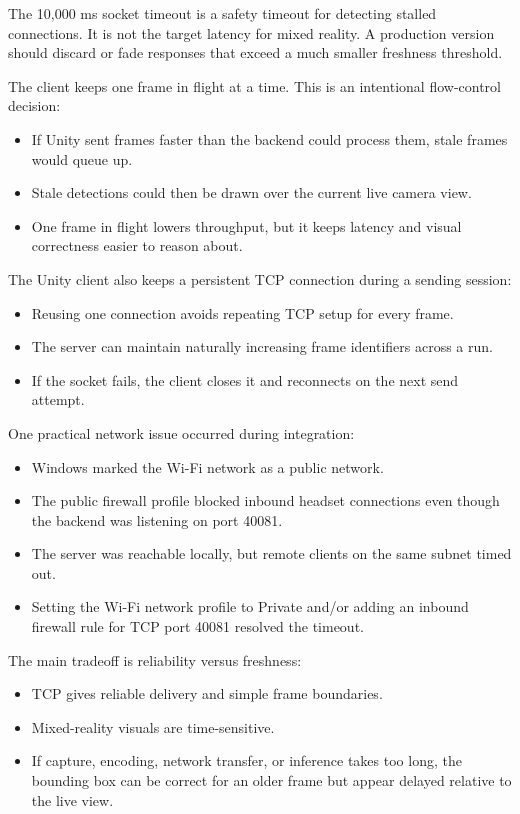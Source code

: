 \documentclass[11pt]{article}
\begin{document}
The 10,000 ms socket timeout is a safety timeout for detecting stalled connections. It is not the target latency for mixed reality. A production version should discard or fade responses that exceed a much smaller freshness threshold.

The client keeps one frame in flight at a time. This is an intentional flow-control decision:

\begin{itemize}
    \item If Unity sent frames faster than the backend could process them, stale frames would queue up.
    \item Stale detections could then be drawn over the current live camera view.
    \item One frame in flight lowers throughput, but it keeps latency and visual correctness easier to reason about.
\end{itemize}

The Unity client also keeps a persistent TCP connection during a sending session:

\begin{itemize}
    \item Reusing one connection avoids repeating TCP setup for every frame.
    \item The server can maintain naturally increasing frame identifiers across a run.
    \item If the socket fails, the client closes it and reconnects on the next send attempt.
\end{itemize}

One practical network issue occurred during integration:

\begin{itemize}
    \item Windows marked the Wi-Fi network as a public network.
    \item The public firewall profile blocked inbound headset connections even though the backend was listening on port 40081.
    \item The server was reachable locally, but remote clients on the same subnet timed out.
    \item Setting the Wi-Fi network profile to Private and/or adding an inbound firewall rule for TCP port 40081 resolved the timeout.
\end{itemize}

The main tradeoff is reliability versus freshness:

\begin{itemize}
    \item TCP gives reliable delivery and simple frame boundaries.
    \item Mixed-reality visuals are time-sensitive.
    \item If capture, encoding, network transfer, or inference takes too long, the bounding box can be correct for an older frame but appear delayed relative to the live view.
\end{itemize}
\end{document}
